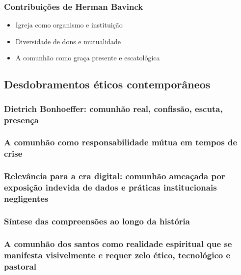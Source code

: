 \subsubsection{Contribuições de Herman Bavinck}
\begin{itemize}
  \item Igreja como organismo e instituição
  \item Diversidade de dons e mutualidade
  \item A comunhão como graça presente e escatológica
\end{itemize}

\subsection{Desdobramentos éticos contemporâneos}
\subsubsection*{Dietrich Bonhoeffer: comunhão real, confissão, escuta, presença}
\subsubsection*{A comunhão como responsabilidade mútua em tempos de crise}
\subsubsection*{Relevância para a era digital: comunhão ameaçada por exposição indevida de dados e práticas institucionais negligentes}
\subsubsection*{Síntese das compreensões ao longo da história}
\subsubsection*{A comunhão dos santos como realidade espiritual que se manifesta visivelmente e requer zelo ético, tecnológico e pastoral}
